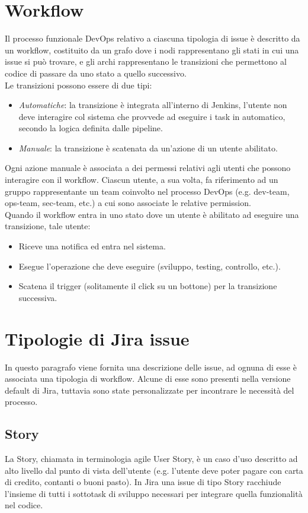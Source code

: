 \documentclass[a4paper, 12pt]{report}
\numberwithin{equation}{section}
\begin{document}
\section{Workflow}
Il processo funzionale DevOps relativo a ciascuna tipologia di issue è descritto da un workflow, costituito da un grafo dove i nodi rappresentano gli stati in cui una issue si può trovare, e gli archi rappresentano le transizioni che permettono al codice di passare da uno stato a quello successivo.\\
Le transizioni possono essere di due tipi:
\begin{itemize}
    \item \emph{Automatiche}: la transizione è integrata all’interno di Jenkins, l’utente non deve interagire col sistema che provvede ad eseguire i task in automatico, secondo la logica definita dalle pipeline.
    \item \emph{Manuale}: la transizione è scatenata da un’azione di un utente abilitato.
\end{itemize}
Ogni azione manuale è associata a dei permessi relativi agli utenti che possono interagire con il workflow. Ciascun utente, a sua volta, fa riferimento ad un gruppo rappresentante un team coinvolto nel processo DevOps (e.g. dev-team, ops-team, sec-team, etc.) a cui sono associate le relative permission. \\
Quando il workflow entra in uno stato dove un utente è abilitato ad eseguire una transizione, tale utente:
\begin{itemize}
    \item Riceve una notifica ed entra nel sistema.
    \item Esegue l’operazione che deve eseguire (sviluppo, testing, controllo, etc.).
    \item Scatena il trigger (solitamente il click su un bottone) per la transizione successiva.
\end{itemize}


\section{Tipologie di Jira issue}
In questo paragrafo viene fornita una descrizione delle issue, ad ognuna di esse è associata una tipologia di workflow. Alcune di esse sono presenti nella versione default di Jira, tuttavia sono state personalizzate per incontrare le necessità del processo.

\subsection{Story}
La Story, chiamata in terminologia agile User Story, è un caso d’uso descritto ad alto livello dal punto di vista dell’utente (e.g. l'utente deve poter pagare con carta di credito, contanti o buoni pasto). In Jira una issue di tipo Story racchiude l’insieme di tutti i sottotask di sviluppo necessari per integrare quella funzionalità nel codice.
\end{document}
